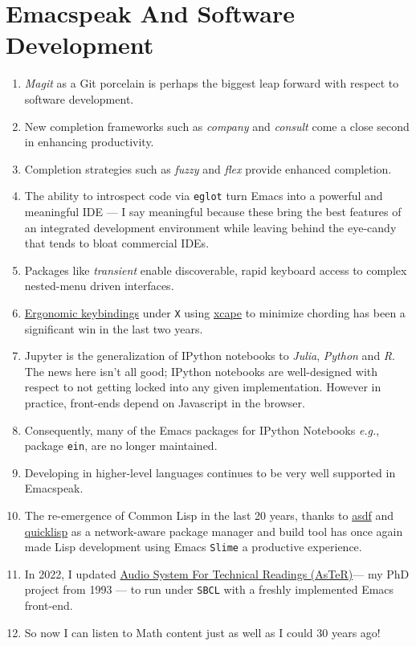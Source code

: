 \documentclass[11pt]{article}
\begin{document}
\section{Emacspeak And Software Development}
\label{sec:orge471334}

\begin{enumerate}
\item \emph{Magit}  as a Git porcelain is perhaps the biggest leap forward
with respect to software development.
\item New completion frameworks such as \emph{company} and \emph{consult} come a
close second in enhancing productivity.
\item Completion strategies such as  \emph{fuzzy} and
\emph{flex} provide  enhanced completion.
\item The ability to introspect code via  \texttt{eglot} 
 turn Emacs into a powerful and meaningful IDE ---  I say
meaningful because these bring the best features of an integrated
development environment while leaving behind the eye-candy that
tends to bloat commercial IDEs.
\item Packages like \emph{transient}  enable discoverable, rapid keyboard access to
complex nested-menu driven interfaces.
\item \href{https://emacspeak.blogspot.com/2023/09/emacs-ergonomics-dont-punish-your.html}{Ergonomic keybindings} under \texttt{X} using \href{https://github.com/alols/xcape}{xcape} to minimize
chording has been  a significant win in the last two years.
\item Jupyter is the   generalization of IPython notebooks to \emph{Julia}, \emph{Python}
and \emph{R}. The news here isn't all good; IPython notebooks are
well-designed with respect to not getting locked into any given
implementation. However in practice,  front-ends
depend on Javascript in the  browser.
\item Consequently, many of the Emacs  packages  for IPython
Notebooks \emph{e.g.}, package \texttt{ein},  are no longer maintained.
\item Developing in higher-level languages continues to be very well
supported in Emacspeak.
\item The re-emergence of Common Lisp in the last 20 years, thanks to
\href{https://asdf.common-lisp.dev/asdf.html}{asdf} and \href{https://www.quicklisp.org/}{quicklisp} as a network-aware package manager and build
tool has once again made Lisp development using Emacs \texttt{Slime} a
productive experience.
\item In 2022, I updated \href{https://emacspeak.blogspot.com/2022/12/aster-spoken-math-on-emacspeak-audio\_21.html}{Audio System For Technical
Readings (AsTeR)}--- my PhD project from 1993 --- to run under \texttt{SBCL}
with a freshly implemented Emacs front-end.
\item So now I can listen to Math content just as well as I could 30
years ago!
\end{enumerate}
\end{document}
